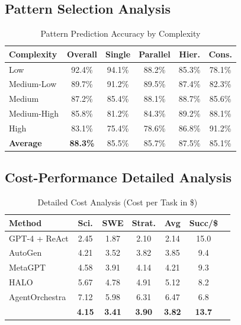 \documentclass{article}
\theoremstyle{plain}
\theoremstyle{definition}
\theoremstyle{remark}
\begin{document}
\subsection{Pattern Selection Analysis}

\begin{table}[H]
	\caption{\car{} Pattern Prediction Accuracy by Complexity}
	\centering
	\small
	\begin{tabular}{@{}lccccc@{}}
		\toprule
		\textbf{Complexity} & \textbf{Overall} & \textbf{Single} & \textbf{Parallel} & \textbf{Hier.} & \textbf{Cons.} \\
		\midrule
		Low & 92.4\% & 94.1\% & 88.2\% & 85.3\% & 78.1\% \\
		Medium-Low & 89.7\% & 91.2\% & 89.5\% & 87.4\% & 82.3\% \\
		Medium & 87.2\% & 85.4\% & 88.1\% & 88.7\% & 85.6\% \\
		Medium-High & 85.8\% & 81.2\% & 84.3\% & 89.2\% & 88.1\% \\
		High & 83.1\% & 75.4\% & 78.6\% & 86.8\% & 91.2\% \\
		\midrule
		\textbf{Average} & \textbf{88.3\%} & 85.5\% & 85.7\% & 87.5\% & 85.1\% \\
		\bottomrule
	\end{tabular}
\end{table}

\subsection{Cost-Performance Detailed Analysis}

\begin{table}[H]
	\caption{Detailed Cost Analysis (Cost per Task in \$)}
	\centering
	\small
	\begin{tabular}{@{}lcccccc@{}}
		\toprule
		\textbf{Method} & \textbf{Sci.} & \textbf{SWE} & \textbf{Strat.} & \textbf{Avg} & \textbf{Succ/\$} \\
		\midrule
		GPT-4 + ReAct & 2.45 & 1.87 & 2.10 & 2.14 & 15.0 \\
		AutoGen & 4.21 & 3.52 & 3.82 & 3.85 & 9.4 \\
		MetaGPT & 4.58 & 3.91 & 4.14 & 4.21 & 9.3 \\
		HALO & 5.67 & 4.78 & 4.91 & 5.12 & 8.2 \\
		AgentOrchestra & 7.12 & 5.98 & 6.31 & 6.47 & 6.8 \\
		\textbf{\amore{}} & \textbf{4.15} & \textbf{3.41} & \textbf{3.90} & \textbf{3.82} & \textbf{13.7} \\
		\bottomrule
	\end{tabular}
\end{table}
\end{document}

